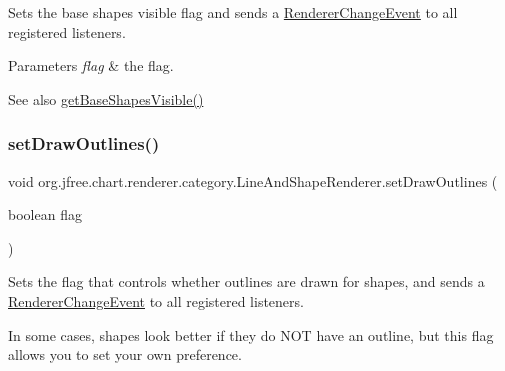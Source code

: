 Sets the base \textquotesingle{}shapes visible\textquotesingle{} flag and sends a \mbox{\hyperlink{}{Renderer\+Change\+Event}} to all registered listeners.


\begin{DoxyParams}{Parameters}
{\em flag} & the flag.\\
\hline
\end{DoxyParams}
\begin{DoxySeeAlso}{See also}
\mbox{\hyperlink{classorg_1_1jfree_1_1chart_1_1renderer_1_1category_1_1_line_and_shape_renderer_a2f676208b847d3847162f57419493426}{get\+Base\+Shapes\+Visible()}} 
\end{DoxySeeAlso}
\mbox{\label{classorg_1_1jfree_1_1chart_1_1renderer_1_1category_1_1_line_and_shape_renderer_a1b3c114bea540187635abc402b024a66}} 
\subsubsection{\texorpdfstring{set\+Draw\+Outlines()}{setDrawOutlines()}}
{\footnotesize\ttfamily void org.\+jfree.\+chart.\+renderer.\+category.\+Line\+And\+Shape\+Renderer.\+set\+Draw\+Outlines (\begin{DoxyParamCaption}\item[{boolean}]{flag }\end{DoxyParamCaption})}

Sets the flag that controls whether outlines are drawn for shapes, and sends a \mbox{\hyperlink{}{Renderer\+Change\+Event}} to all registered listeners. 

In some cases, shapes look better if they do N\+OT have an outline, but this flag allows you to set your own preference.


